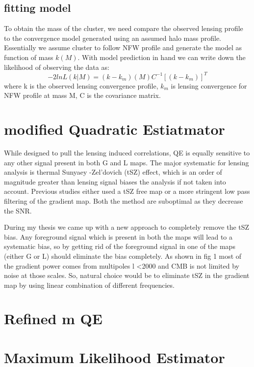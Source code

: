\documentclass[usenatbib, twocolumn, nofootinbib, reprint, emulateapj, amsart]{revtex4-1}
\begin{document}
 \subsection{fitting model}
To obtain the mass of the cluster, we need compare the observed lensing profile to the convergence model generated using an assumed halo mass profile.
Essentially we assume cluster to follow NFW profile and generate the model as function of mass $k(M)$. 
With model prediction in hand we can write down the likelihood of observing the data as:
\begin{equation}
-2 ln L (k | M) = (k - k_{m})(M) C^{-1} [(k - k_{m})]^{T}
\end{equation}
where k is the observed lensing convergence profile, $k_{m}$ is lensing convergence for NFW profile at mass M, C is the covariance matrix. 
 
\section{modified Quadratic Estiatmator}
While designed to pull the lensing induced correlations, QE is equally sensitive to any other signal present in both G and L maps.
The major systematic for lensing analysis is thermal Sunyaey -Zel'dovich (tSZ) effect, which is an order of magnitude greater than lensing signal biases the analysis if not taken into account. 
 Previous studies either used a tSZ free map or a more stringent low pass filtering of the gradient map.
 Both the method are suboptimal as they decrease the SNR. 
 
 During my thesis we came up with a new approach to completely remove the tSZ bias. 
 Any foreground signal which is present in both the maps will lead to a systematic bias, so by getting rid of the foreground signal in one of the maps (either G or L) should eliminate the bias completely.
  As shown in fig 1 most of the gradient power comes from multipoles l <2000 and CMB is not limited by noise at those scales.
  So, natural choice would be to eliminate tSZ in the gradient map by using linear combination of different frequencies. 
  

  


\section{Refined m QE}
\section{Maximum Likelihood Estimator}
\end{document}
